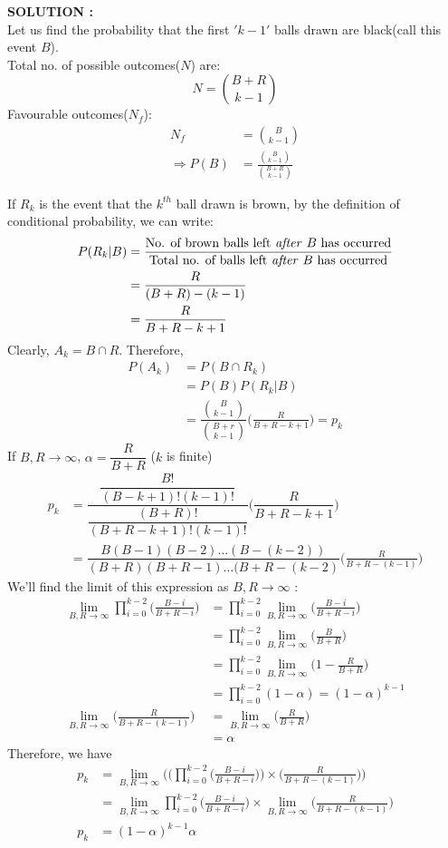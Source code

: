\documentclass{article}
\begin{document}
\hspace{1em} \large{\textbf{SOLUTION :}} \\
 
Let us find the probability that the first $'k-1'$ balls drawn are black(call this event $B$).\\
Total no. of possible outcomes($N$) are:
$$N = {{B+R}\choose {k-1}}$$
Favourable outcomes($N_f$):
\begin{align*}
    N_f &= {B\choose {k-1}}\\
\Rightarrow 
P(B)&=\frac{{B\choose {k-1}}}{{{B+R}\choose {k-1}}}
\end{align*}

If $R_k$ is the event that the $k^{th}$ ball drawn is brown, by the definition of conditional probability, we can write:
\begin{align*}
    P(R_k|B)&=\frac{\text{No. of brown balls left \textit{after} $B$ has occurred}}{\text{Total no. of balls left \textit{after} $B$ has occurred}}\\
    &=\frac{R}{(B+R)-(k-1)}\\
    &=\frac{R}{B+R-k+1}
\end{align*}
Clearly, $A_k=B\cap R$. Therefore,
\begin{align*}
    P(A_k)&=P(B\cap R_k)\\&= P(B)P(R_k|B)\\
    &=\dfrac{{B\choose {k-1}}}{{{B+r}\choose{k-1}}}\Big(\frac{R}{B+R-k+1}\Big)=p_k
\end{align*}
If $B, R \rightarrow \infty$, $\alpha = \dfrac{R}{B+R}$ ($k$ is finite)
\begin{align}
    p_k &= \dfrac{\dfrac{B!}{(B-k+1)!(k-1)!}}{\dfrac{(B+R)!}{(B+R-k+1)!(k-1)!}}\Big(\dfrac{R}{B+R-k+1}\Big)\nonumber\\
    &=\dfrac{B(B-1)(B-2)\dots(B-(k-2))}{(B+R)(B+R-1)\dots(B+R-(k-2)}\Big(\frac{R}{B+R-(k-1)}\Big)
\end{align}
We'll find the limit of this expression as $B,R\to\infty$ :
\begin{align}
    \lim_{B,R\to \infty}\prod^{k-2}_{i=0}\Big(\frac{B-i}{B+R-i}\Big) &= \prod^{k-2}_{i=0}\lim_{B,R\to\infty}\Big(\frac{B-i}{B+R-i}\Big)\nonumber\\
    &=\prod^{k-2}_{i=0}\lim_{B,R\to\infty}\Big(\frac{B}{B+R}\Big) \nonumber\\
   &=\prod^{k-2}_{i=0}\lim_{B,R\to\infty}\Big(1-\frac{R}{B+R}\Big)\nonumber\\
   &=\prod^{k-2}_{i=0}(1-\alpha) = (1-\alpha)^{k-1}\\
   \lim_{B,R\to \infty}\Big(\frac{R}{B+R-(k-1)}\Big)
   &= \lim_{B,R\to \infty}\Big(\frac{R}{B+R}\Big)\nonumber\\
   &= \alpha
\end{align}
Therefore, we have
\begin{align*}
  p_k &= \lim_{B,R\to \infty}\Big(\Big(\prod^{k-2}_{i=0}\Big(\frac{B-i}{B+R-i}\Big)\Big)\times\Big(\frac{R}{B+R-(k-1)}\Big)\Big)\\
  &=\lim_{B,R\to \infty}\prod^{k-2}_{i=0}\Big(\frac{B-i}{B+R-i}\Big)\times\lim_{B,R\to \infty}\Big(\frac{R}{B+R-(k-1)}\Big)\\
  p_k &= (1-\alpha)^{k-1}\alpha
\end{align*}
\end{document}
